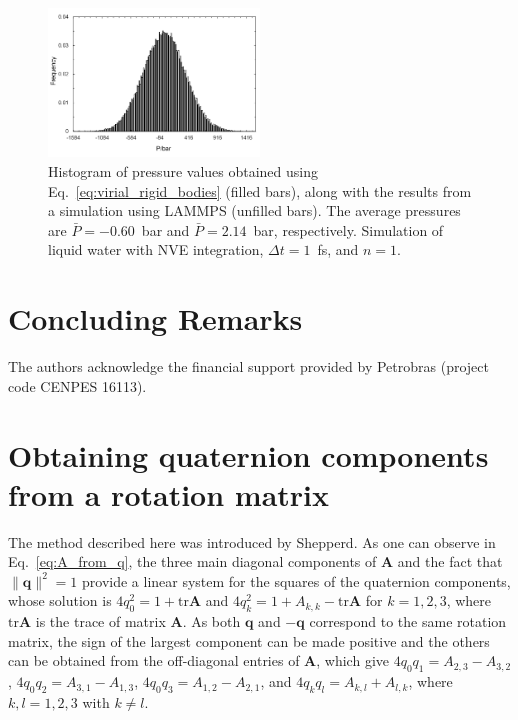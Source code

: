 \documentclass[aip,jcp,reprint,amsmath,amssymb]{revtex4-1}
\newcommand{\mt}[1]{\boldsymbol{\mathbf{#1}}}           %
\newcommand{\vt}[1]{\boldsymbol{\mathbf{#1}}}           %
\begin{document}
\begin{figure}
	\includegraphics[width=0.5\textwidth,keepaspectratio]{FiguraAna}
	\caption{Histogram of pressure values obtained using Eq.~\ref{eq:virial_rigid_bodies} (filled bars), along with the results from a simulation using LAMMPS (unfilled bars). The average pressures are $\bar{P} = -0.60$~bar and $\bar{P} = 2.14$~bar, respectively. Simulation of liquid water with NVE integration, $\Delta t = 1$~fs, and $n = 1$.}
	\label{fig:pressure}
\end{figure}

\section{Concluding Remarks}
\label{sec:conclusion}

\begin{acknowledgments}
The authors acknowledge the financial support provided by Petrobras (project code CENPES 16113).
\end{acknowledgments}

\appendix

\section{Obtaining quaternion components from a rotation matrix}
\label{sec:quat_from_A}

The method described here was introduced by Shepperd.\cite{Shepperd1978} As one can observe in Eq.~\ref{eq:A_from_q}, the three main diagonal components of $\mt A$ and the fact that $\lVert \vt q \lVert^2 = 1$ provide a linear system for the squares of the quaternion components, whose solution is $4 q_0^2 = 1 + \text{tr}\mt A$ and $4 q_k^2 = 1 + A_{k,k} - \text{tr}\mt A$ for $k = 1, 2, 3$, where $\text{tr}\mt A$ is the trace of matrix $\mt A$. As both $\vt q$ and $- \vt q$ correspond to the same rotation matrix, the sign of the largest component\cite{Shepperd1978} can be made positive and the others can be obtained from the off-diagonal entries of $\mt A$, which give $4 q_0 q_1 = A_{2,3} - A_{3,2}$, $4 q_0 q_2 = A_{3,1} - A_{1,3}$, $4 q_0 q_3 = A_{1,2} - A_{2,1}$, and $4 q_k q_l = A_{k,l} + A_{l,k}$, where $k,l = 1,2,3$ with $k \neq l$.
\end{document}
